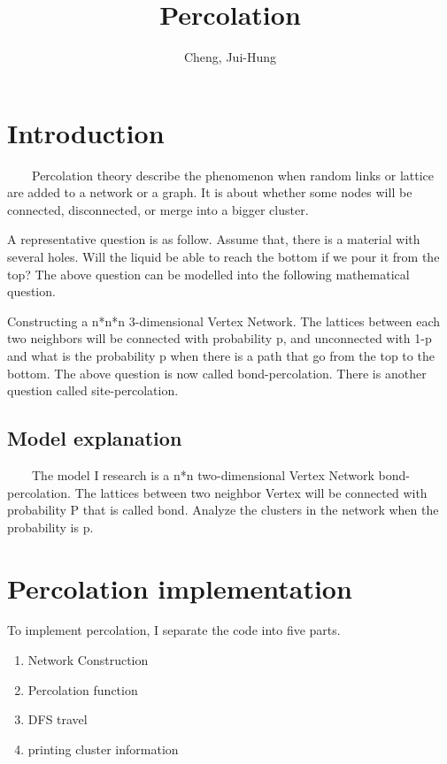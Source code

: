 \documentclass{article}
\title{Percolation}
\author{Cheng, Jui-Hung}
\begin{document}
\maketitle

\section{Introduction}

~~~~Percolation theory describe the phenomenon when random links or lattice are added to a network or a graph. It is about whether some nodes will be  connected, disconnected, or merge into a bigger cluster.

A representative question is as follow. Assume that, there is a material with several holes. Will the liquid be able to reach the bottom if we pour it from the top? The above question can be modelled into the following mathematical question. 

Constructing a n*n*n 3-dimensional Vertex Network. The lattices between each two neighbors will be connected with probability p, and unconnected with 1-p and what is the probability p when there is a path that go from the top to the bottom. The above question is now called bond-percolation. There is another question called site-percolation.

\subsection{Model explanation}

~~~~The model I research is a n*n two-dimensional Vertex Network bond-percolation. The lattices between two neighbor Vertex will be connected with probability P that is called bond. Analyze the clusters in the network when the probability is p.

\section{Percolation implementation}

To implement percolation, I separate the code into five parts.
\begin{enumerate}
    \item Network Construction 
    \item Percolation function
    \item DFS travel
    \item printing cluster information 
\end{enumerate}
\end{document}
